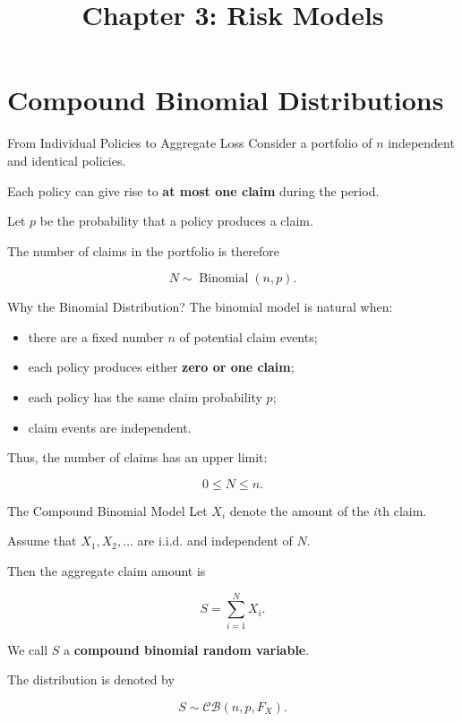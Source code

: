\documentclass[
  ignorenonframetext,
  aspectratio=169,
]{beamer}
\title{\texorpdfstring{Chapter 3: Risk Models}{Chapter 3: Risk Models}}
\author{}
\date{}
\providecommand{\tightlist}{%
  \setlength{\itemsep}{0pt}\setlength{\parskip}{0pt}}
\begin{document}
\frame{\titlepage}


\section{Compound Binomial Distributions}\label{compound-binomial}

\begin{frame}{From Individual Policies to Aggregate Loss}
\protect{}\label{from-individual-policies-to-aggregate-loss}
Consider a portfolio of \(n\) independent and identical policies.

Each policy can give rise to \textbf{at most one claim} during the
period.

Let \(p\) be the probability that a policy produces a claim.

The number of claims in the portfolio is therefore

\[
N \sim \operatorname{Binomial}(n,p).
\]
\end{frame}

\begin{frame}{Why the Binomial Distribution?}
\protect{}\label{why-the-binomial-distribution}
The binomial model is natural when:

\begin{itemize}
\tightlist
\item
  there are a fixed number \(n\) of potential claim events;
\item
  each policy produces either \textbf{zero or one claim};
\item
  each policy has the same claim probability \(p\);
\item
  claim events are independent.
\end{itemize}

Thus, the number of claims has an upper limit:

\[
0 \leq N \leq n.
\]
\end{frame}

\begin{frame}{The Compound Binomial Model}
\protect{}\label{the-compound-binomial-model}
Let \(X_i\) denote the amount of the \(i\)th claim.

Assume that \(X_1,X_2,\ldots\) are i.i.d. and independent of \(N\).

Then the aggregate claim amount is

\[
S=\sum_{i=1}^{N}X_i.
\]

We call \(S\) a \textbf{compound binomial random variable}.

The distribution is denoted by

\[
S\sim\mathcal{CB}(n,p,F_X).
\]
\end{frame}
\end{document}
